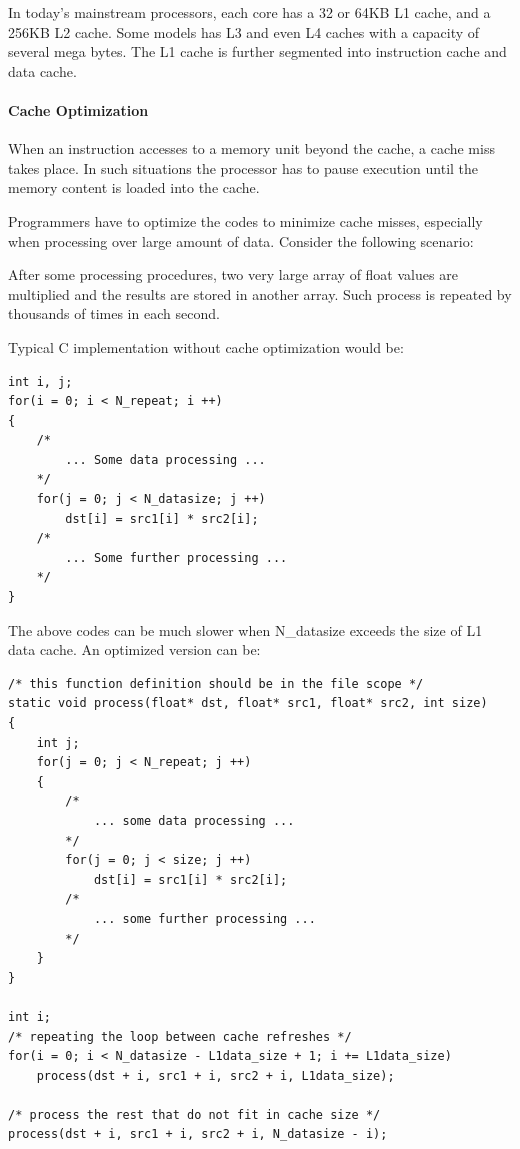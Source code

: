 \documentclass[a4paper]{report}
\begin{document}
	In today's mainstream processors, each core has a 32 or 64KB L1 cache, and a 256KB L2 cache. Some models has L3 and even L4 caches with a capacity of several mega bytes. The L1 cache is further segmented into instruction cache and data cache.

\paragraph{Cache Optimization} \indent \bigskip

	When an instruction accesses to a memory unit beyond the cache, a cache miss takes place. In such situations the processor has to pause execution until the memory content is loaded into the cache.
	
	Programmers have to optimize the codes to minimize cache misses, especially when processing over large amount of data. Consider the following scenario:
	
	After some processing procedures, two very large array of float values are multiplied and the results are stored in another array. Such process is repeated by thousands of times in each second.
	
	Typical C implementation without cache optimization would be:

        \lstset{language = c, tabsize = 4}
        \begin{lstlisting}
int i, j;
for(i = 0; i < N_repeat; i ++)
{
	/*
		... Some data processing ...
	*/
	for(j = 0; j < N_datasize; j ++)
		dst[i] = src1[i] * src2[i];
	/*
		... Some further processing ...
	*/
}
        \end{lstlisting}

	The above codes can be much slower when N\_datasize exceeds the size of L1 data cache. An optimized version can be:

        \lstset{language = c, tabsize = 4}
        \begin{lstlisting}
/* this function definition should be in the file scope */
static void process(float* dst, float* src1, float* src2, int size)
{
	int j;
	for(j = 0; j < N_repeat; j ++)
	{
		/*
			... some data processing ...
		*/
		for(j = 0; j < size; j ++)
			dst[i] = src1[i] * src2[i];
		/*
			... some further processing ...
		*/
	}
}

int i;
/* repeating the loop between cache refreshes */
for(i = 0; i < N_datasize - L1data_size + 1; i += L1data_size)
	process(dst + i, src1 + i, src2 + i, L1data_size);

/* process the rest that do not fit in cache size */
process(dst + i, src1 + i, src2 + i, N_datasize - i);
        \end{lstlisting}
\end{document}
